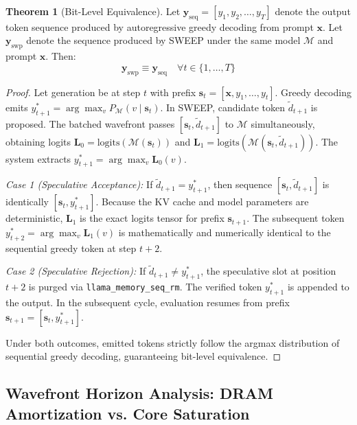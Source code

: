 \documentclass[journal,10pt,twocolumn]{article}
\theoremstyle{definition}
\newtheorem{theorem}{Theorem}
\begin{document}
\begin{theorem}[Bit-Level Equivalence]
Let $\mathbf{y}_{\text{seq}} = [y_1, y_2, \dots, y_T]$ denote the output token sequence produced by autoregressive greedy decoding from prompt $\mathbf{x}$. Let $\mathbf{y}_{\text{swp}}$ denote the sequence produced by SWEEP under the same model $\mathcal{M}$ and prompt $\mathbf{x}$. Then:
\begin{equation}
\mathbf{y}_{\text{swp}} \equiv \mathbf{y}_{\text{seq}} \quad \forall t \in \{1, \dots, T\}
\end{equation}
\end{theorem}

\begin{proof}
Let generation be at step $t$ with prefix $\mathbf{s}_t = [\mathbf{x}, y_1, \dots, y_t]$. Greedy decoding emits $y_{t+1}^* = \arg\max_{v} P_{\mathcal{M}}(v \mid \mathbf{s}_t)$.
In SWEEP, candidate token $\tilde{d}_{t+1}$ is proposed. The batched wavefront passes $[\mathbf{s}_t, \tilde{d}_{t+1}]$ to $\mathcal{M}$ simultaneously, obtaining logits $\mathbf{L}_0 = \text{logits}(\mathcal{M}(\mathbf{s}_t))$ and $\mathbf{L}_1 = \text{logits}(\mathcal{M}(\mathbf{s}_t, \tilde{d}_{t+1}))$.
The system extracts $y_{t+1}^* = \arg\max_v \mathbf{L}_0(v)$.

\textit{Case 1 (Speculative Acceptance):} If $\tilde{d}_{t+1} = y_{t+1}^*$, then sequence $[\mathbf{s}_t, \tilde{d}_{t+1}]$ is identically $[\mathbf{s}_t, y_{t+1}^*]$. Because the KV cache and model parameters are deterministic, $\mathbf{L}_1$ is the exact logits tensor for prefix $\mathbf{s}_{t+1}$. The subsequent token $y_{t+2}^* = \arg\max_v \mathbf{L}_1(v)$ is mathematically and numerically identical to the sequential greedy token at step $t+2$.

\textit{Case 2 (Speculative Rejection):} If $\tilde{d}_{t+1} \neq y_{t+1}^*$, the speculative slot at position $t+2$ is purged via \texttt{llama\_memory\_seq\_rm}. The verified token $y_{t+1}^*$ is appended to the output. In the subsequent cycle, evaluation resumes from prefix $\mathbf{s}_{t+1} = [\mathbf{s}_t, y_{t+1}^*]$. 

Under both outcomes, emitted tokens strictly follow the argmax distribution of sequential greedy decoding, guaranteeing bit-level equivalence.
\end{proof}

\subsection{Wavefront Horizon Analysis: DRAM Amortization vs. Core Saturation}
\end{document}
